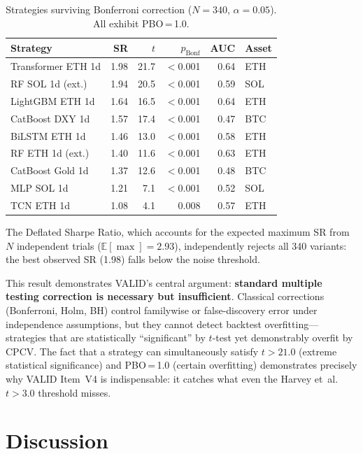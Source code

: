 \documentclass[sigconf,anonymous,review]{acmart}
\begin{document}
\begin{table}[t]
\centering
\caption{Strategies surviving Bonferroni correction ($N\!=\!340$,
$\alpha\!=\!0.05$). All exhibit PBO\,=\,1.0.}
\label{tab:bonf}
\footnotesize
\setlength{\tabcolsep}{3pt}
\begin{tabular}{lrrrrl}
\toprule
Strategy & SR & $t$ & $p_\text{Bonf}$ & AUC & Asset \\
\midrule
Transformer ETH 1d   & 1.98 & 21.7 & $<$0.001 & 0.64 & ETH \\
RF SOL 1d (ext.)     & 1.94 & 20.5 & $<$0.001 & 0.59 & SOL \\
LightGBM ETH 1d      & 1.64 & 16.5 & $<$0.001 & 0.64 & ETH \\
CatBoost DXY 1d      & 1.57 & 17.4 & $<$0.001 & 0.47 & BTC \\
BiLSTM ETH 1d        & 1.46 & 13.0 & $<$0.001 & 0.58 & ETH \\
RF ETH 1d (ext.)     & 1.40 & 11.6 & $<$0.001 & 0.63 & ETH \\
CatBoost Gold 1d     & 1.37 & 12.6 & $<$0.001 & 0.48 & BTC \\
MLP SOL 1d           & 1.21 &  7.1 & $<$0.001 & 0.52 & SOL \\
TCN ETH 1d           & 1.08 &  4.1 & 0.008    & 0.57 & ETH \\
\bottomrule
\end{tabular}
\end{table}
The Deflated Sharpe Ratio, which accounts for the expected maximum SR
from $N$ independent trials ($\mathbb{E}[\max]=2.93$), independently
rejects all 340 variants: the best observed SR (1.98) falls below the
noise threshold.

This result demonstrates VALID's central argument: \textbf{standard
multiple testing correction is necessary but insufficient}. Classical
corrections (Bonferroni, Holm, BH) control familywise or
false-discovery error under independence assumptions, but they cannot
detect backtest overfitting---strategies that are statistically
``significant'' by $t$-test yet demonstrably overfit by CPCV. The
fact that a strategy can simultaneously satisfy $t > 21.0$ (extreme
statistical significance) and PBO\,=\,1.0 (certain overfitting)
demonstrates precisely why VALID Item~V4 is indispensable:
it catches what even the Harvey et~al.\ $t>3.0$ threshold misses.


\section{Discussion}
\label{sec:discussion}
\end{document}
